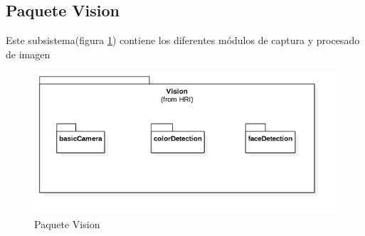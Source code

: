 \newpage
\subsection{Paquete Vision}
Este subsistema(figura \ref{fig:vision-package}) contiene los diferentes módulos de captura y procesado de imagen

\begin{figure}
	\centering
	\includegraphics[width=0.8\linewidth]{imagenes/diagramas/Vision.png}
	\caption{Paquete Vision}
	\label{fig:vision-package}
\end{figure}

